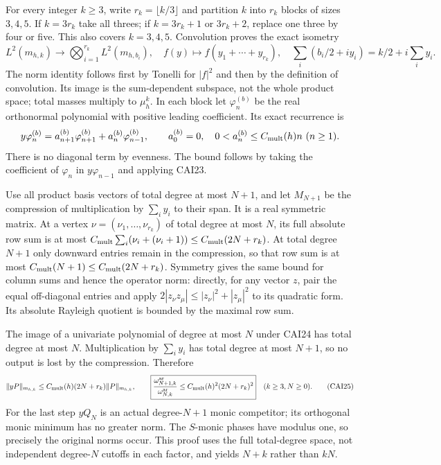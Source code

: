 For every integer $k\ge3$, write $r_k=\lfloor k/3\rfloor$ and
partition $k$ into $r_k$ blocks of sizes $3,4,5$. If $k=3r_k$ take
all threes; if $k=3r_k+1$ or $3r_k+2$, replace one three by four or
five. This also covers $k=3,4,5$. Convolution proves the exact isometry
\[
 L^2(m_{h,k})\longrightarrow\bigotimes_{i=1}^{r_k}L^2(m_{h,b_i}),
 \quad f(y)\longmapsto f(y_1+\cdots+y_{r_k}),\quad
 \sum_i(b_i/2+iy_i)=k/2+i\sum_iy_i.\tag{CAI24}
\]
The norm identity follows first by Tonelli for $|f|^2$ and then by
the definition of convolution. Its image is the sum-dependent
subspace, not the whole product space; total masses multiply to
$\mu_h^k$. In each block let $\varphi_n^{(b)}$ be the real orthonormal
polynomial with positive leading coefficient. Its exact recurrence is
\[
 y\varphi_n^{(b)}=a_{n+1}^{(b)}\varphi_{n+1}^{(b)}
                         +a_n^{(b)}\varphi_{n-1}^{(b)},\qquad
 a_0^{(b)}=0,\quad 0<a_n^{(b)}\le C_{\rm mult}(h)n\ (n\ge1).
\]
There is no diagonal term by evenness. The bound follows by taking
the coefficient of $\varphi_n$ in $y\varphi_{n-1}$ and applying CAI23.

Use all product basis vectors of total degree at most $N+1$, and let
$M_{N+1}$ be the compression of multiplication by $\sum_i y_i$ to
their span. It is a real symmetric matrix. At a vertex
$\nu=(\nu_1,\ldots,\nu_{r_k})$ of total degree at most $N$, its full
absolute row sum is at most
$C_{\rm mult}\sum_i(\nu_i+(\nu_i+1))\le C_{\rm mult}(2N+r_k)$.
At total degree $N+1$ only downward entries remain in the compression,
so that row sum is at most $C_{\rm mult}(N+1)\le C_{\rm mult}(2N+r_k)$.
Symmetry gives the same bound for column sums and hence the operator
norm: directly, for any vector $z$, pair the equal off-diagonal entries
and apply $2|z_\nu z_\mu|\le|z_\nu|^2+|z_\mu|^2$ to its quadratic
form. Its absolute Rayleigh quotient is bounded by the maximal row sum.

The image of a univariate polynomial of degree at most $N$ under CAI24
has total degree at most $N$. Multiplication by $\sum_i y_i$ has total
degree at most $N+1$, so no output is lost by the compression. Therefore
\[
 \|yP\|_{m_{h,k}}\le C_{\rm mult}(h)(2N+r_k)\|P\|_{m_{h,k}},\qquad
 \boxed{\frac{\omega_{N+1,k}^{\rm ar}}{\omega_{N,k}^{\rm ar}}
         \le C_{\rm mult}(h)^2(2N+r_k)^2}\quad(k\ge3,N\ge0).
 \tag{CAI25}
\]
For the last step $yQ_N$ is an actual degree-$N+1$ monic competitor;
its orthogonal monic minimum has no greater norm. The $S$-monic phases
have modulus one, so precisely the original norms occur. This proof
uses the full total-degree space, not independent degree-$N$ cutoffs
in each factor, and yields $N+k$ rather than $kN$.

